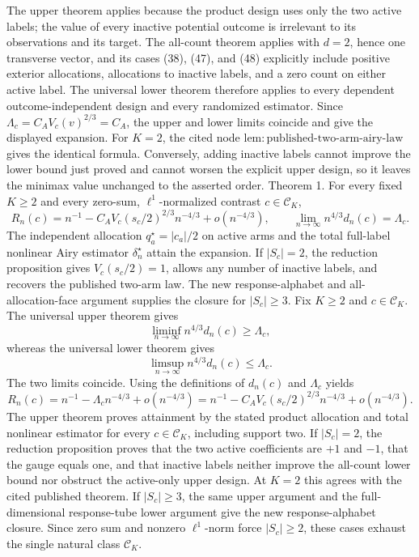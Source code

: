 The upper theorem applies because the product design uses only the two active labels; the value of every inactive potential outcome is irrelevant to its observations and its target.  The all-count theorem applies with \(d=2\), hence one transverse vector, and its cases (38), (47), and (48) explicitly include positive exterior allocations, allocations to inactive labels, and a zero count on either active label.  The universal lower theorem therefore applies to every dependent outcome-independent design and every randomized estimator.  Since \(\Lambda_c=C_AV_c(v)^{2/3}=C_A\), the upper and lower limits coincide and give the displayed expansion.  For \(K=2\), the cited node \(\mathrm{lem:published\text{-}two\text{-}arm\text{-}airy\text{-}law}\) gives the identical formula.  Conversely, adding inactive labels cannot improve the lower bound just proved and cannot worsen the explicit upper design, so it leaves the minimax value unchanged to the asserted order.
Theorem 1. For every fixed \(K\ge2\) and every zero-sum, \(\ell^1\)-normalized contrast \(c\in\mathcal C_K\),
\[
R_n(c)=n^{-1}-C_AV_c(s_c/2)^{2/3}n^{-4/3}+o(n^{-4/3}),
\qquad
\lim_{n\to\infty}n^{4/3}d_n(c)=\Lambda_c.
\]
The independent allocation \(q_a^\star=|c_a|/2\) on active arms and the total full-label nonlinear Airy estimator \(\delta_n^\star\) attain the expansion.  If \(|S_c|=2\), the reduction proposition gives \(V_c(s_c/2)=1\), allows any number of inactive labels, and recovers the published two-arm law.  The new response-alphabet and all-allocation-face argument supplies the closure for \(|S_c|\ge3\).
Fix \(K\ge2\) and \(c\in\mathcal C_K\).  The universal upper theorem gives
\[
\liminf_{n\to\infty}n^{4/3}d_n(c)\ge\Lambda_c,
\]
whereas the universal lower theorem gives
\[
\limsup_{n\to\infty}n^{4/3}d_n(c)\le\Lambda_c.
\]
The two limits coincide.  Using the definitions of \(d_n(c)\) and \(\Lambda_c\) yields
\[
R_n(c)=n^{-1}-\Lambda_cn^{-4/3}+o(n^{-4/3})
=n^{-1}-C_AV_c(s_c/2)^{2/3}n^{-4/3}+o(n^{-4/3}).
\]
The upper theorem proves attainment by the stated product allocation and total nonlinear estimator for every \(c\in\mathcal C_K\), including support two.  If \(|S_c|=2\), the reduction proposition proves that the two active coefficients are \(+1\) and \(-1\), that the gauge equals one, and that inactive labels neither improve the all-count lower bound nor obstruct the active-only upper design.  At \(K=2\) this agrees with the cited published theorem.  If \(|S_c|\ge3\), the same upper argument and the full-dimensional response-tube lower argument give the new response-alphabet closure.  Since zero sum and nonzero \(\ell^1\)-norm force \(|S_c|\ge2\), these cases exhaust the single natural class \(\mathcal C_K\).

